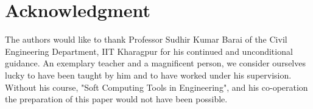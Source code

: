 \documentclass[conference]{IEEEtran}
\begin{document}
\section*{Acknowledgment}
The authors would like to thank Professor Sudhir Kumar Barai of the Civil Engineering Department, IIT Kharagpur for his continued and unconditional guidance. An exemplary teacher and a magnificent person, we consider ourselves lucky to have been taught by him and to have worked under his supervision. Without his course, "Soft Computing Tools in Engineering", and his co-operation the preparation of this paper would not have been possible.


\ifCLASSOPTIONcaptionsoff
  \newpage
\fi





%
%
%

% 
\end{document}
